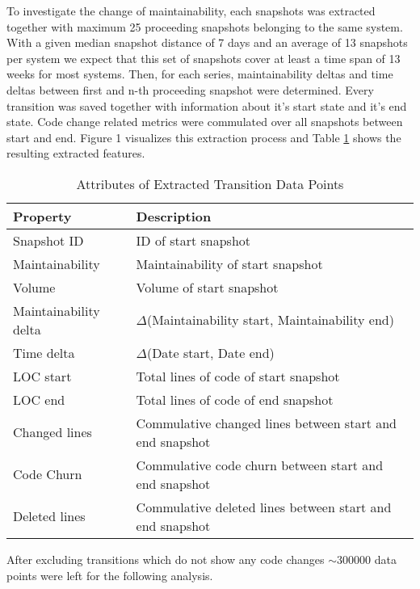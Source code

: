 To investigate the change of maintainability, each snapshots was extracted together with maximum 25 proceeding snapshots belonging to the same system. With a given median snapshot distance of 7 days and an average of 13 snapshots per system we expect that this set of snapshots cover at least a time span of 13 weeks for most systems. Then, for each series, maintainability deltas and time deltas between first and n-th proceeding snapshot were determined. Every transition was saved together with information about it's start state and it's end state. Code change related metrics were commulated over all snapshots between start and end. Figure 1 visualizes this extraction process and Table \ref{data_points} shows the resulting extracted features.
\begin{table}[htbp!]
\caption{Attributes of Extracted Transition Data Points}
\begin{tabular}{l  p{5.2cm}}
  \hline			
  Property & Description \\ \hline
  Snapshot ID & ID of start snapshot \\
  Maintainability & Maintainability of start snapshot\\ 
  Volume & Volume of start snapshot\\ 
  Maintainability delta & \(\Delta\)(Maintainability start, Maintainability end)\\
  Time delta & \(\Delta\)(Date start, Date end)\\
  LOC start & Total lines of code of start snapshot\\ 
  LOC end & Total lines of code of end snapshot\\ 
  Changed lines & Commulative changed lines between start and end snapshot \\
  Code Churn & Commulative code churn between start and end snapshot \\ 
  Deleted lines & Commulative deleted lines between start and end snapshot \\ \hline
\end{tabular}
\label{data_points}
\end{table}

After excluding transitions which do not show any code changes $\sim$300000 data points were left for the following analysis.

